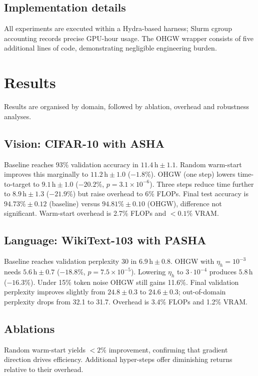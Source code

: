 \documentclass{article} %
\begin{document}
\subsection{Implementation details}
All experiments are executed within a Hydra-based harness; Slurm cgroup accounting records precise GPU-hour usage. The OHGW wrapper consists of five additional lines of code, demonstrating negligible engineering burden.

\section{Results}\label{sec:results}
Results are organised by domain, followed by ablation, overhead and robustness analyses.

\subsection{Vision: CIFAR-10 with ASHA}
Baseline reaches 93\% validation accuracy in \(11.4\,\text{h} \pm 1.1\). Random warm-start improves this marginally to \(11.2\,\text{h} \pm 1.0\) (\(-1.8\%\)). OHGW (one step) lowers time-to-target to \(9.1\,\text{h} \pm 1.0\) (\(-20.2\%\), \(p = 3.1 \times 10^{-6}\)). Three steps reduce time further to \(8.9\,\text{h} \pm 1.3\) (\(-21.9\%\)) but raise overhead to 6\% FLOPs. Final test accuracy is \(94.73\% \pm 0.12\) (baseline) versus \(94.81\% \pm 0.10\) (OHGW), difference not significant. Warm-start overhead is 2.7\% FLOPs and \(<0.1\%\) VRAM\@.

\subsection{Language: WikiText-103 with PASHA}
Baseline reaches validation perplexity 30 in \(6.9\,\text{h} \pm 0.8\). OHGW with \(\eta_h = 10^{-3}\) needs \(5.6\,\text{h} \pm 0.7\) (\(-18.8\%\), \(p = 7.5 \times 10^{-5}\)). Lowering \(\eta_h\) to \(3\cdot10^{-4}\) produces \(5.8\,\text{h}\) (\(-16.3\%\)). Under 15\% token noise OHGW still gains 11.6\%. Final validation perplexity improves slightly from \(24.8 \pm 0.3\) to \(24.6 \pm 0.3\); out-of-domain perplexity drops from 32.1 to 31.7. Overhead is 3.4\% FLOPs and 1.2\% VRAM\@.

\subsection{Ablations}
Random warm-start yields \(<2\%\) improvement, confirming that gradient direction drives efficiency. Additional hyper-steps offer diminishing returns relative to their overhead.
\end{document}
